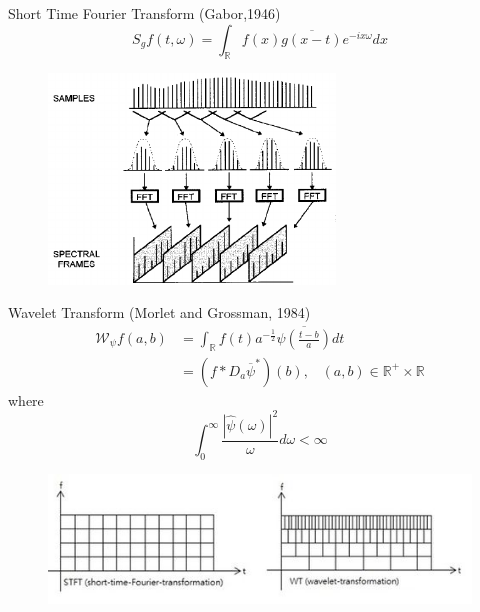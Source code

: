 \begin{frame}{Short Time Fourier Transform (Gabor,1946)}
$$
S_gf(t,\omega)=\int_{\mathbb{R}} f(x)\overline{g(x-t)}e^{-ix\omega}dx
$$
\pause
\begin{figure}[h!]
\centering
\includegraphics[width=0.68\textwidth]{./Images/STFT.png}
\end{figure}
\end{frame}

\begin{frame}{Wavelet Transform (Morlet and Grossman, 1984)}
$$
\begin{aligned}
\mathcal{W}_{\psi}f(a,b)&=\int_{\mathbb{R}}f(t)a^{-\frac{1}{2}}\overline{\psi\left(\frac{t-b}{a}\right)}dt\\
&=(f\ast D_a\overline{\psi}^*)(b)\textrm{,}\quad (a, b)\in\mathbb{R}^+\times\mathbb{R}
\end{aligned} 
$$
where 
$$
\int_0^{\infty}\frac{|\hat{\psi}(\omega)|^2}{\omega}d\omega<\infty
$$
\pause
\begin{figure}[h!]
\centering
\includegraphics[width=1\textwidth]{./Images/wavelet.jpg}
\end{figure}
\end{frame}

